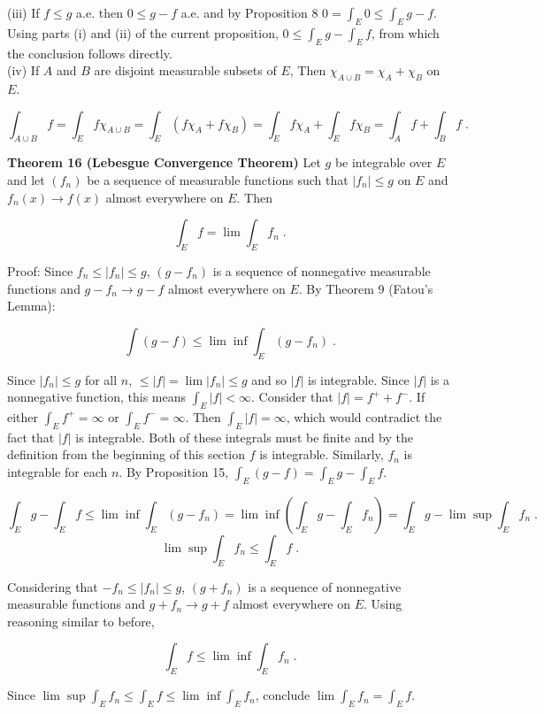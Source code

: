 \documentclass[a4paper]{article}
\begin{document}
(iii) If $f\leq g$ a.e. then $0 \leq g-f$ a.e. and by Proposition 8 $0 = \int_E 0 \leq \int_E g-f$. Using parts (i) and (ii) of the current proposition, $0 \leq \int_E g - \int_E f$, from which the conclusion follows directly. \\

(iv) If $A$ and $B$ are disjoint measurable subsets of $E$, Then $\chi_{A\cup B} = \chi_A + \chi_B$ on $E$.

$$\int_{A\cup B} f = \int_E f \chi_{A\cup B} = \int_E (f\chi_A + f\chi_B) = \int_E f\chi_A + \int_E f\chi_B = \int_A f + \int_B f \;.$$

{\bf Theorem 16 (Lebesgue Convergence Theorem)} Let $g$ be integrable over $E$ and let $(f_n)$ be a sequence of measurable functions such that $|f_n| \leq g$ on $E$ and $f_n(x) \rightarrow f(x)$ almost everywhere on $E$. Then

$$\int_E f  = \lim \int_E f_n \;. $$

Proof: Since $f_n \leq |f_n| \leq g$, $(g-f_n)$ is a sequence of nonnegative measurable functions and $g-f_n \rightarrow g-f$ almost everywhere on $E$. By Theorem 9 (Fatou's Lemma):

$$\int (g-f) \leq \lim \inf \int_E (g- f_n) \;.$$

Since $|f_n| \leq g$ for all $n$, $\leq |f| = \lim |f_n| \leq g$ and so $|f|$ is integrable. Since $|f|$ is a nonnegative function, this means $\int_E |f| < \infty$. Consider that $|f| = f^+ + f^-$. If either $\int_E f^+ = \infty$ or $\int_E f^- = \infty$. Then $\int_E |f| = \infty$, which would contradict the fact that $|f|$ is integrable. Both of these integrals must be finite and by the definition from the beginning of this section $f$ is integrable. Similarly, $f_n$ is integrable for each $n$. By Proposition 15, $\int_E (g-f) = \int_E g - \int_E f$. 

$$\int_E g - \int_E f \leq \lim \inf \int_E (g-f_n) =\lim \inf \left(\int_E g - \int_E f_n \right) = \int_E g - \lim \sup \int_E f_n \;.$$
$$\lim \sup\int_E f_n \leq \int_E f \;.$$

Considering that $-f_n \leq |f_n| \leq g$, $(g+f_n)$ is a sequence of nonnegative measurable functions and $g+f_n \rightarrow g + f$ almost everywhere on $E$. Using reasoning similar to before, 

$$\int_E f \leq \lim \inf \int_E f_n \;.$$

Since $\lim \sup \int_E f_n \leq \int_E f \leq \lim \inf \int_E f_n$, conclude $\lim \int_E f_n = \int_E f$. \\
\end{document}
